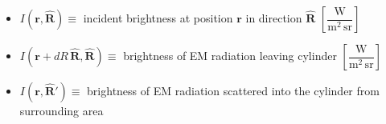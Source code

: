 \documentclass[11pt, oneside]{article}
\newcommand{\rv}{\mathbf{r}}
\newcommand{\Rh}{\hat{\mathbf{R}}}
\begin{document}
\begin{itemize}
	\item[] $I(\rv,\Rh) \equiv$ incident brightness at position $\rv$ in direction $\Rh$ $\left[\dfrac{\text{W}}{\text{m}^2\,\text{sr}}\right]$
	\item[] $I(\rv + dR\,\Rh, \Rh) \equiv$ brightness of EM radiation leaving cylinder $\left[\dfrac{\text{W}}{\text{m}^2\,\text{sr}}\right]$
	\item[] $I(\rv,\Rh') \equiv$ brightness of EM radiation scattered into the cylinder from surrounding area
\end{itemize}
\end{document}
